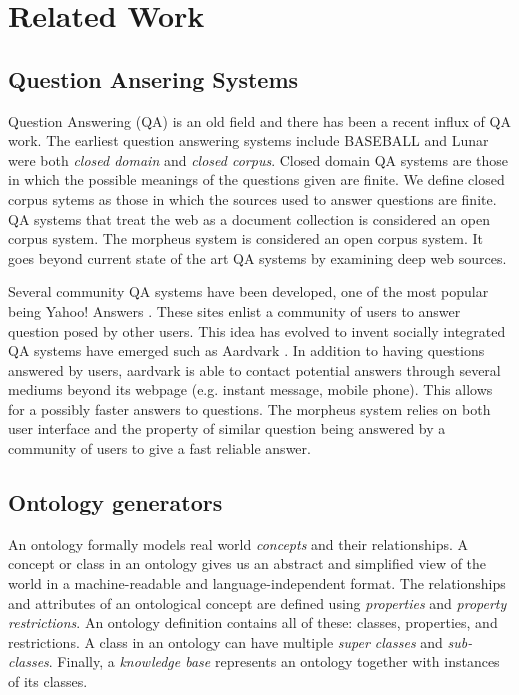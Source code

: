 \section{Related Work}
\label{sec:relatedwork}

\subsection{Question Ansering Systems} 

Question Answering (QA) is an old field and there has been a recent influx of QA work. The earliest question answering systems include BASEBALL \cite{Green1961} and Lunar \cite{woods1973} were both \emph{closed domain} and \emph{closed corpus}.  Closed domain QA systems are those in which the possible meanings of the questions given are finite. We define closed corpus sytems as those in which the sources used to answer questions are finite.  QA systems that treat the web as a document collection is considered an open corpus system.  The morpheus system is considered an open corpus system.  It goes beyond current state of the art QA systems by examining deep web sources.

Several community QA systems have been developed, one of the most popular being Yahoo! Answers \cite{yahooanswers2008}.  These sites enlist a community of users to answer question posed by other users.  This idea has evolved to invent socially integrated QA systems have emerged such as Aardvark \cite{vark2010}. In addition to having questions answered by users, aardvark is able to contact potential answers through several mediums beyond its webpage (e.g. instant message, mobile phone).  This allows for a possibly faster answers to questions.  The morpheus system relies on both user interface and the property of similar question being answered by a community of users to give a fast reliable answer.


\subsection{Ontology generators} 

An ontology formally models real world \textit{concepts} and their
relationships. A concept or class in an ontology gives us an abstract and
simplified view of the world\cite{Gruber1993} in a machine-readable and
language-independent format. The relationships and attributes of an
ontological concept are defined using \textit{properties} and \textit{property
restrictions}. An ontology definition contains all of
these: classes, properties, and restrictions. A class in an ontology can have
multiple \textit{super classes} and \textit{sub-classes}. Finally, a
\textit{knowledge base} represents an ontology together with 
instances of its classes.      

